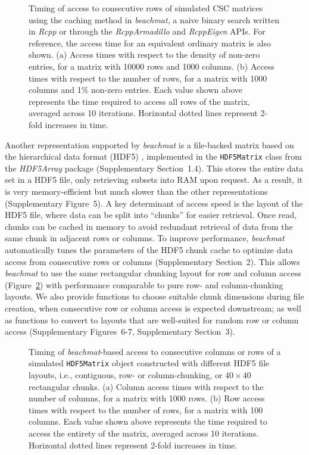 \documentclass[10pt,letterpaper]{article}
\newcommand{\suppfighdfspeed}{5}
\newcommand{\suppfighdfrandom}{6-7}
\newcommand{\suppsechdfmat}{1.4}
\newcommand{\suppseclayoutoptim}{2}
\newcommand{\suppseclayoutrandom}{3}
\newcommand{\beachmat}{\textit{beachmat}}
\newcommand{\code}[1]{\texttt{#1}}
\begin{document}
\begin{figure}[b]
    \caption{Timing of access to consecutive rows of simulated CSC matrices using the caching method in \beachmat{}, a naive binary search written in \textit{Rcpp} or through the \textit{RcppArmadillo} and \textit{RcppEigen} APIs.
For reference, the access time for an equivalent ordinary matrix is also shown.
(a) Access times with respect to the density of non-zero entries, for a matrix with 10000 rows and 1000 columns.
(b) Access times with respect to the number of rows, for a matrix with 1000 columns and 1\% non-zero entries.
Each value shown above represents the time required to access all rows of the matrix, averaged across 10 iterations.
Horizontal dotted lines represent 2-fold increases in time.}
\label{fig:sparse}
\end{figure}

Another representation supported by \beachmat{} is a file-backed matrix based on the hierarchical data format (HDF5) \cite{hdf5}, 
implemented in the \texttt{HDF5Matrix} class from the \textit{HDF5Array} package (Supplementary Section~\suppsechdfmat{}).
This stores the entire data set in a HDF5 file, only retrieving subsets into RAM upon request.
As a result, it is very memory-efficient but much slower than the other representations (Supplementary Figure~\suppfighdfspeed{}).
A key determinant of access speed is the layout of the HDF5 file, where data can be split into ``chunks'' for easier retrieval.
Once read, chunks can be cached in memory to avoid redundant retrieval of data from the same chunk in adjacent rows or columns.
To improve performance, \beachmat{} automatically tunes the parameters of the HDF5 chunk cache to optimize data access from consecutive rows or columns (Supplementary Section~\suppseclayoutoptim{}).
This allows \beachmat{} to use the same rectangular chunking layout for row and column access (Figure~\ref{fig:hdf5}) with performance comparable to pure row- and column-chunking layouts.
We also provide functions to choose suitable chunk dimensions during file creation, when consecutive row or column access is expected downstream;
as well as functions to convert to layouts that are well-suited for random row or column access (Supplementary Figures~\suppfighdfrandom{}, Supplementary Section~\suppseclayoutrandom{}).

\begin{figure}[b]
    \caption{Timing of \beachmat{}-based access to consecutive columns or rows of a simulated \code{HDF5Matrix} object constructed with different HDF5 file layouts, 
i.e., contiguous, row- or column-chunking, or $40\times40$ rectangular chunks.
(a) Column access times with respect to the number of columns, for a matrix with 1000 rows.
(b) Row access times with respect to the number of rows, for a matrix with 100 columns.
Each value shown above represents the time required to access the entirety of the matrix, averaged across 10 iterations.
Horizontal dotted lines represent 2-fold increases in time.}
\label{fig:hdf5}
\end{figure}
\end{document}
